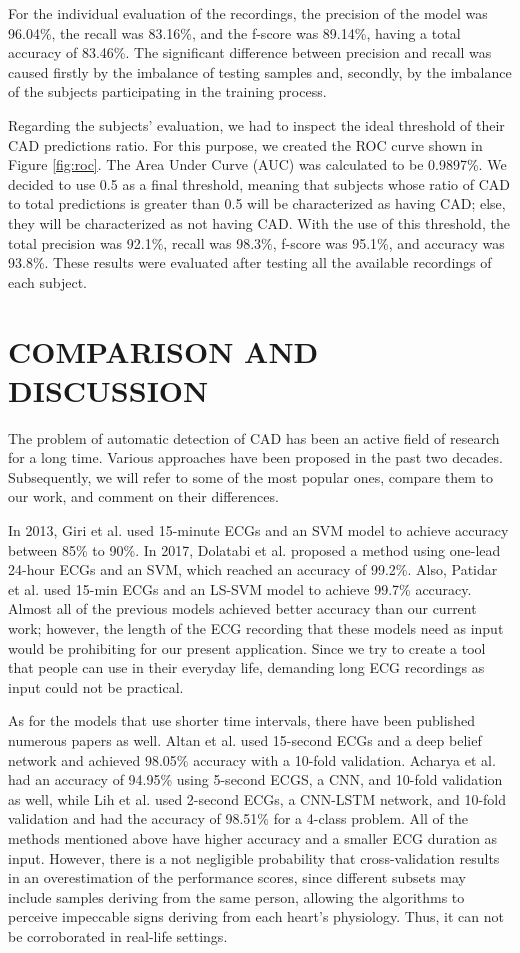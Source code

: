 For the individual evaluation of the recordings, the precision of the model was 96.04\%, the recall was 83.16\%, and the f-score was 89.14\%, having a total accuracy of 83.46\%. The significant difference between precision and recall was caused firstly by the imbalance of testing samples and, secondly, by the imbalance of the subjects participating in the training process.

Regarding the subjects' evaluation, we had to inspect the ideal threshold of their CAD predictions ratio. For this purpose, we created the ROC curve shown in Figure \ref{fig:roc}. The Area Under Curve (AUC) was calculated to be 0.9897\%. We decided to use 0.5 as a final threshold, meaning that subjects whose ratio of CAD to total predictions is greater than 0.5 will be characterized as having CAD; else, they will be characterized as not having CAD. With the use of this threshold, the total precision was 92.1\%, recall was 98.3\%, f-score was 95.1\%, and accuracy was 93.8\%. These results were evaluated after testing all the available recordings of each subject.
%
\section{COMPARISON AND DISCUSSION}
\label{sec:comparison}
The problem of automatic detection of CAD has been an active field of research for a long time. Various approaches have been proposed in the past two decades. Subsequently, we will refer to some of the most popular ones, compare them to our work, and comment on their differences.

In 2013, Giri et al. \cite{giri} used 15-minute ECGs and an SVM model to achieve accuracy between 85\% to 90\%. In 2017, Dolatabi et al. \cite{dolatabadi} proposed a method using one-lead 24-hour ECGs and an SVM, which reached an accuracy of 99.2\%. Also, Patidar et al. \cite{patidar} used 15-min ECGs and an LS-SVM model to achieve 99.7\% accuracy. Almost all of the previous models achieved better accuracy than our current work; however, the length of the ECG recording that these models need as input would be prohibiting for our present application. Since we try to create a tool that people can use in their everyday life, demanding long ECG recordings as input could not be practical.

As for the models that use shorter time intervals, there have been published numerous papers as well. Altan et al. \cite{altan} used 15-second ECGs and a deep belief network and achieved 98.05\% accuracy with a 10-fold validation. Acharya et al. \cite{acharya} had an accuracy of 94.95\% using 5-second ECGS, a CNN, and 10-fold validation as well, while Lih et al. \cite{lih} used 2-second ECGs, a CNN-LSTM network, and 10-fold validation and had the accuracy of 98.51\% for a 4-class problem. All of the methods mentioned above have higher accuracy and a smaller ECG duration as input. However, there is a not negligible probability that cross-validation results in an overestimation of the performance scores, since different subsets may include samples deriving from the same person, allowing the algorithms to perceive impeccable signs deriving from each heart's physiology. Thus, it can not be corroborated in real-life settings.

